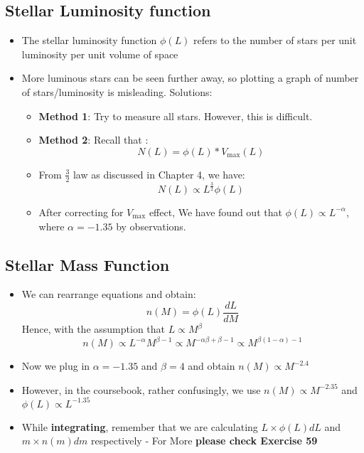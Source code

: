 \documentclass{article}
\begin{document}
\subsection{Stellar Luminosity function}
\begin{itemize}
\item The stellar luminosity function $\phi(L)$ refers to the number of stars per unit
luminosity per unit volume of space
\item More luminous stars can be seen further away, so plotting a graph of number of stars/luminosity is misleading. Solutions:
\begin{itemize}
\item \textbf{Method 1}: Try to measure all stars. However, this is difficult.
\item \textbf{Method 2}: Recall that :
\begin{equation}
N(L)=\phi(L)*V_\text{max}(L)
\end{equation}
\item From $\frac{3}{2}$ law as discussed in Chapter 4, we have:
\begin{equation}
N(L) \propto  L^{\frac{3}{2}}\phi(L)
\end{equation}
\item After correcting for $V_\text{max}$ effect, We have found out that $\phi(L) \propto L^{-\alpha}$, where $\alpha=-1.35$ by observations.
\end{itemize}
\end{itemize}
\subsection{Stellar Mass Function}
\begin{itemize}
\item We can rearrange equations and obtain:
\begin{equation}
n(M)= \phi (L) \frac{dL}{dM}
\end{equation}
Hence, with the assumption that $L \propto M^{\beta}$
\begin{equation}
n(M) \propto L^{-\alpha} M^{\beta-1} \propto M^{-\alpha\beta+\beta-1} \propto M^{\beta(1-\alpha)-1}
\end{equation}
\item Now we plug in $\alpha=-1.35$ and $\beta=4$ and obtain $n(M) \propto M^{-2.4}$
\item However, in the coursebook, rather confusingly, we use $n(M) \propto M^{-2.35}$ and $\phi(L) \propto L^{-1.35}$
\item While \textbf{integrating}, remember that we are calculating $L \times \phi(L)dL$ and $ m \times n(m)dm$ respectively - For More \textbf{please check Exercise 59} 
\end{itemize}
\end{document}
